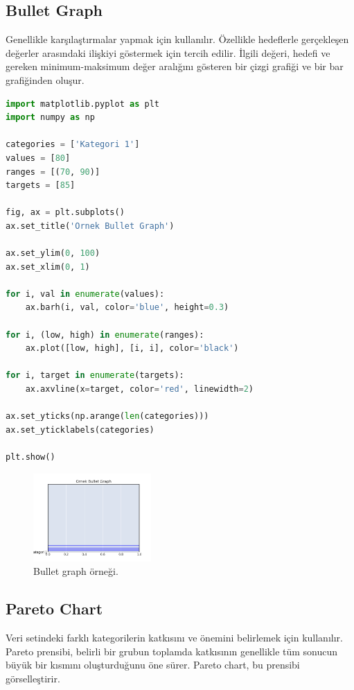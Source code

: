 \newpage

\subsection{Bullet Graph}
Genellikle karşılaştırmalar yapmak için kullanılır. Özellikle hedeflerle gerçekleşen değerler arasındaki ilişkiyi göstermek için tercih edilir. İlgili değeri, hedefi ve gereken minimum-maksimum değer aralığını gösteren bir çizgi grafiği ve bir bar grafiğinden oluşur.

\begin{lstlisting}[language=Python]
import matplotlib.pyplot as plt
import numpy as np

categories = ['Kategori 1']
values = [80]
ranges = [(70, 90)]
targets = [85]

fig, ax = plt.subplots()
ax.set_title('Ornek Bullet Graph')

ax.set_ylim(0, 100)
ax.set_xlim(0, 1)

for i, val in enumerate(values):
    ax.barh(i, val, color='blue', height=0.3)

for i, (low, high) in enumerate(ranges):
    ax.plot([low, high], [i, i], color='black')

for i, target in enumerate(targets):
    ax.axvline(x=target, color='red', linewidth=2)

ax.set_yticks(np.arange(len(categories)))
ax.set_yticklabels(categories)

plt.show()
\end{lstlisting}

\begin{figure}[h]
    \centering
    \includegraphics[width=0.4\textwidth]{images/bullet_graph.png}
    \caption{Bullet graph örneği.}
    \label{fig:enter-label}
\end{figure}

\newpage

\subsection{Pareto Chart}
Veri setindeki farklı kategorilerin katkısını ve önemini belirlemek için kullanılır. Pareto prensibi, belirli bir grubun toplamda katkısının genellikle tüm sonucun büyük bir kısmını oluşturduğunu öne sürer. Pareto chart, bu prensibi görselleştirir.

